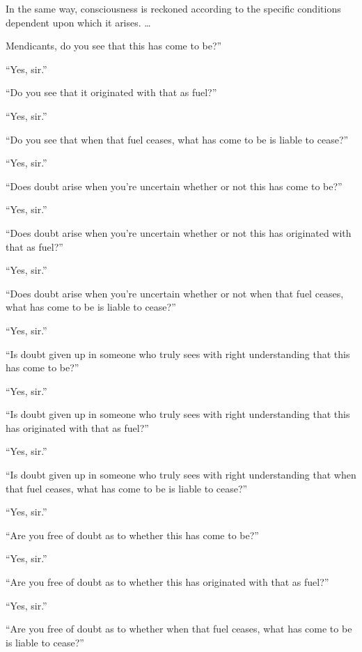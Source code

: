 \documentclass[12pt,openany]{book}%
\begin{document}
In the same way, consciousness is reckoned according to the specific conditions dependent upon which it arises. … 

Mendicants, do you see that this has come to be?” 

“Yes, sir.” 

“Do you see that it originated with that as fuel?” 

“Yes, sir.” 

“Do you see that when that fuel ceases, what has come to be is liable to cease?” 

“Yes, sir.” 

“Does doubt arise when you’re uncertain whether or not this has come to be?” 

“Yes, sir.” 

“Does doubt arise when you’re uncertain whether or not this has originated with that as fuel?” 

“Yes, sir.” 

“Does doubt arise when you’re uncertain whether or not when that fuel ceases, what has come to be is liable to cease?” 

“Yes, sir.” 

“Is doubt given up in someone who truly sees with right understanding that this has come to be?” 

“Yes, sir.” 

“Is doubt given up in someone who truly sees with right understanding that this has originated with that as fuel?” 

“Yes, sir.” 

“Is doubt given up in someone who truly sees with right understanding that when that fuel ceases, what has come to be is liable to cease?” 

“Yes, sir.” 

“Are you free of doubt as to whether this has come to be?” 

“Yes, sir.” 

“Are you free of doubt as to whether this has originated with that as fuel?” 

“Yes, sir.” 

“Are you free of doubt as to whether when that fuel ceases, what has come to be is liable to cease?” 
\end{document}
